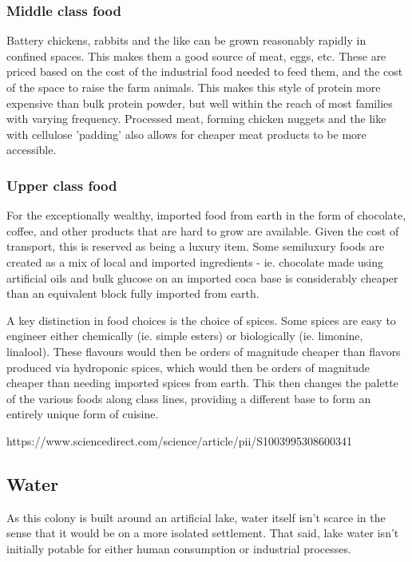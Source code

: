 \documentclass[10pt]{article}
\begin{document}
\subsubsection*{Middle class food}
Battery chickens, rabbits and the like can be grown reasonably rapidly in confined spaces. This makes them a good source of meat, eggs, etc. These are priced based on the cost of the industrial food needed to feed them, and the cost of the space to raise the farm animals. This makes this style of protein more expensive than bulk protein powder, but well within the reach of most families with varying frequency. Processed meat, forming chicken nuggets and the like with cellulose 'padding' also allows for cheaper meat products to be more accessible. 

\subsubsection*{Upper class food}
For the exceptionally wealthy, imported food from earth in the form of chocolate, coffee, and other products that are hard to grow are available. Given the cost of transport, this is reserved as being a luxury item. Some semiluxury foods are created as a mix of local and imported ingredients - ie. chocolate made using artificial oils and bulk glucose on an imported coca base is considerably cheaper than an equivalent block fully imported from earth.

A key distinction in food choices is the choice of spices. Some spices are easy to engineer either chemically (ie. simple esters) or biologically (ie. limonine, linalool). These flavours would then be orders of magnitude cheaper than flavors produced via hydroponic spices, which would then be orders of magnitude cheaper than needing imported spices from earth. This then changes the palette of the various foods along class lines, providing a different base to form an entirely unique form of cuisine. 

https://www.sciencedirect.com/science/article/pii/S1003995308600341



\subsection*{Water}

As this colony is built around an artificial lake, water itself isn't scarce in the sense that it would be on a more isolated settlement. That said, lake water isn't initially potable for either human consumption or industrial processes.
\end{document}

